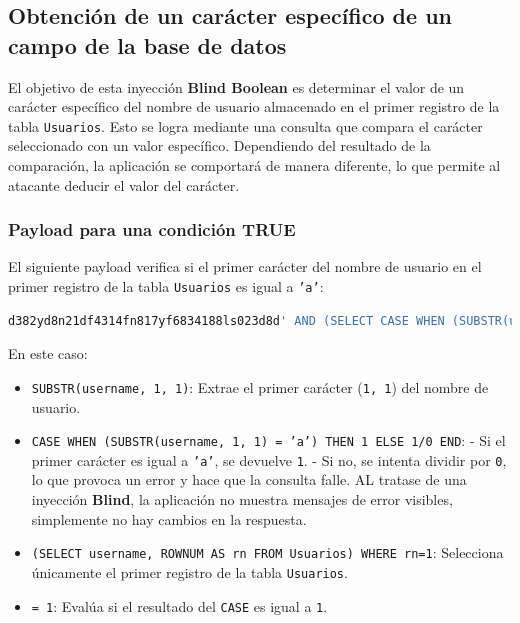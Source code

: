 \documentclass[a4paper,12pt]{article}
\begin{document}
\subsection{Obtención de un carácter específico de un campo de la base de datos}

El objetivo de esta inyección \textbf{Blind Boolean} es determinar el valor de un carácter específico del nombre de usuario almacenado en el primer registro de la tabla \texttt{Usuarios}. Esto se logra mediante una consulta que compara el carácter seleccionado con un valor específico. Dependiendo del resultado de la comparación, la aplicación se comportará de manera diferente, lo que permite al atacante deducir el valor del carácter.

\subsubsection{Payload para una condición TRUE}

El siguiente payload verifica si el primer carácter del nombre de usuario en el primer registro de la tabla \texttt{Usuarios} es igual a \texttt{'a'}:

\begin{lstlisting}[language=SQL]
d382yd8n21df4314fn817yf6834188ls023d8d' AND (SELECT CASE WHEN (SUBSTR(username, 1, 1) = 'a') THEN 1 ELSE 1/0 END FROM (SELECT username, ROWNUM AS rn FROM Usuarios) WHERE rn=1) = 1 --
\end{lstlisting}

En este caso:
\begin{itemize}
    \item \texttt{SUBSTR(username, 1, 1)}: Extrae el primer carácter (\texttt{1, 1}) del nombre de usuario.
    \item \texttt{CASE WHEN (SUBSTR(username, 1, 1) = 'a') THEN 1 ELSE 1/0 END}:
    - Si el primer carácter es igual a \texttt{'a'}, se devuelve \texttt{1}.
    - Si no, se intenta dividir por \texttt{0}, lo que provoca un error y hace que la consulta falle. AL tratase de una inyección \textbf{Blind}, la aplicación no muestra mensajes de error visibles, simplemente no hay cambios en la respuesta.
    \item \texttt{(SELECT username, ROWNUM AS rn FROM Usuarios) WHERE rn=1}: Selecciona únicamente el primer registro de la tabla \texttt{Usuarios}.
    \item \texttt{= 1}: Evalúa si el resultado del \texttt{CASE} es igual a \texttt{1}.
\end{itemize}
\end{document}
